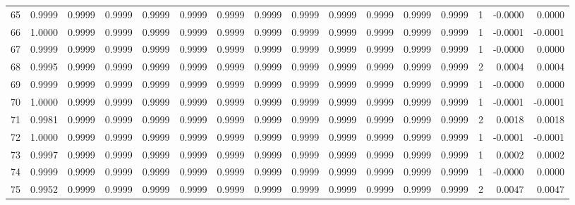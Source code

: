 \begin{tabular}{lrrrrrrrrrrrrrrr}
65  &      0.9999 &  0.9999 &  0.9999 &  0.9999 &  0.9999 &  0.9999 &  0.9999 &  0.9999 &  0.9999 &  0.9999 &   0.9999 &     0.9999 &      1 &                   -0.0000 &                     0.0000 \\
66  &      1.0000 &  0.9999 &  0.9999 &  0.9999 &  0.9999 &  0.9999 &  0.9999 &  0.9999 &  0.9999 &  0.9999 &   0.9999 &     0.9999 &      1 &                   -0.0001 &                    -0.0001 \\
67  &      0.9999 &  0.9999 &  0.9999 &  0.9999 &  0.9999 &  0.9999 &  0.9999 &  0.9999 &  0.9999 &  0.9999 &   0.9999 &     0.9999 &      1 &                   -0.0000 &                     0.0000 \\
68  &      0.9995 &  0.9999 &  0.9999 &  0.9999 &  0.9999 &  0.9999 &  0.9999 &  0.9999 &  0.9999 &  0.9999 &   0.9999 &     0.9999 &      2 &                    0.0004 &                     0.0004 \\
69  &      0.9999 &  0.9999 &  0.9999 &  0.9999 &  0.9999 &  0.9999 &  0.9999 &  0.9999 &  0.9999 &  0.9999 &   0.9999 &     0.9999 &      1 &                   -0.0000 &                     0.0000 \\
70  &      1.0000 &  0.9999 &  0.9999 &  0.9999 &  0.9999 &  0.9999 &  0.9999 &  0.9999 &  0.9999 &  0.9999 &   0.9999 &     0.9999 &      1 &                   -0.0001 &                    -0.0001 \\
71  &      0.9981 &  0.9999 &  0.9999 &  0.9999 &  0.9999 &  0.9999 &  0.9999 &  0.9999 &  0.9999 &  0.9999 &   0.9999 &     0.9999 &      2 &                    0.0018 &                     0.0018 \\
72  &      1.0000 &  0.9999 &  0.9999 &  0.9999 &  0.9999 &  0.9999 &  0.9999 &  0.9999 &  0.9999 &  0.9999 &   0.9999 &     0.9999 &      1 &                   -0.0001 &                    -0.0001 \\
73  &      0.9997 &  0.9999 &  0.9999 &  0.9999 &  0.9999 &  0.9999 &  0.9999 &  0.9999 &  0.9999 &  0.9999 &   0.9999 &     0.9999 &      1 &                    0.0002 &                     0.0002 \\
74  &      0.9999 &  0.9999 &  0.9999 &  0.9999 &  0.9999 &  0.9999 &  0.9999 &  0.9999 &  0.9999 &  0.9999 &   0.9999 &     0.9999 &      1 &                   -0.0000 &                     0.0000 \\
75  &      0.9952 &  0.9999 &  0.9999 &  0.9999 &  0.9999 &  0.9999 &  0.9999 &  0.9999 &  0.9999 &  0.9999 &   0.9999 &     0.9999 &      2 &                    0.0047 &                     0.0047 \\

\end{tabular}
